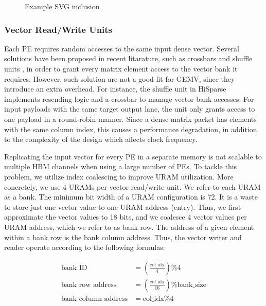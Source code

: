 \documentclass[manuscript,screen,review]{acmart}
\begin{document}
\begin{figure}[h]
	\centering
	
	\caption{Example SVG inclusion}
	\label{fig:input-packets}
\end{figure}

\subsubsection{Vector Read/Write Units}
Each PE requires random accesses to the same input dense vector. Several solutions have been proposed in recent litarature, such as crossbars and shuffle units \cite{hisparse,fccm-spmv}, in order to grant every matrix element access to the vector bank it requires. However, such solution are not a good fit for GEMV, since they introduce an extra overhead. For instance, the shuffle unit in HiSparse \cite{hisparse} implements resending logic and a crossbar to manage vector bank accesses. For input payloads with the same target output lane, the unit only grants access to one payload in a round-robin manner. Since a dense matrix packet has elements with the same column index, this causes a performance degradation, in addition to the complexity of the design which affects clock frequency.

Replicating the input vector for every PE in a separate memory is not scalable to
multiple HBM channels when using a large number of PEs. To tackle this problem, we utilize index coalescing to improve URAM utilization. More concretely, we use 4 URAMs per vector read/write unit. We refer to each URAM as a bank. The minimum bit width of a URAM configuration is 72. It is a waste to store just one vector value to one URAM address (entry). Thus, we first approximate the vector values to 18 bits, and we coalesce 4 vector values per URAM address, which we refer to as bank row. The address of a given element within a bank row is the bank column address. Thus, the vector writer and reader operate according to the following formulas:

\begin{align}
	\text{bank ID} &= \left(\frac{\text{col\_idx}}{4}\right) \% 4 \\
	\text{bank row address} &= \left(\frac{\text{col\_idx}}{16}\right) \% \text{bank\_size} \\
	\text{bank column address} &= \text{col\_idx} \% 4
\end{align}
\end{document}
